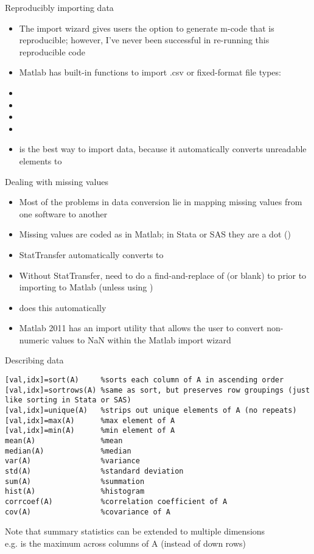 \documentclass[english,xcolor=dvipsnames]{beamer}
\begin{document}
\begin{frame}{Reproducibly importing data}
\begin{itemize}
	\item The import wizard gives users the option to generate m-code that is reproducible; however, I've never been successful in re-running this reproducible code
	\item Matlab has built-in functions to import .csv or fixed-format file types:
	\item {}
	\item {}
  \item {}
  \item {}
  \item {} is the best way to import data, because it automatically converts unreadable elements to 
\end{itemize}
\end{frame}

\begin{frame}{Dealing with missing values}
\begin{itemize}
	\item Most of the problems in data conversion lie in mapping missing values from one software to another
	\item Missing values are coded as  in Matlab; in Stata or SAS they are a dot ()
	\item StatTransfer automatically converts  to 
	\item Without StatTransfer, need to do a find-and-replace of  (or blank) to  prior to importing to Matlab (unless using )
	\item {} does this automatically
	\item Matlab 2011 has an import utility that allows the user to convert non-numeric values to NaN within the Matlab import wizard
\end{itemize}
\end{frame}

\begin{frame}[fragile]{Describing data}
\begin{lstlisting}
[val,idx]=sort(A)     %sorts each column of A in ascending order
[val,idx]=sortrows(A) %same as sort, but preserves row groupings (just like sorting in Stata or SAS)
[val,idx]=unique(A)   %strips out unique elements of A (no repeats)
[val,idx]=max(A)      %max element of A
[val,idx]=min(A)      %min element of A
mean(A)               %mean
median(A)             %median
var(A)                %variance
std(A)                %standard deviation
sum(A)                %summation
hist(A)               %histogram
corrcoef(A)           %correlation coefficient of A
cov(A)                %covariance of A
\end{lstlisting}
Note that summary statistics can be extended to multiple dimensions\\
e.g.  is the maximum across columns of A (instead of down rows)
\end{frame}
\end{document}
